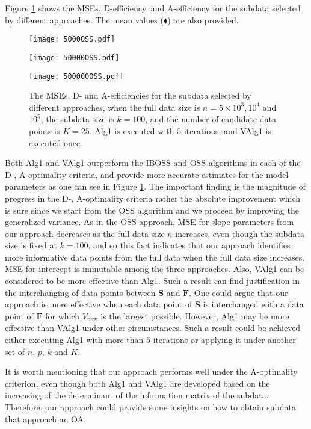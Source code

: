 \documentclass[12pt]{article}
\theoremstyle{definition}
\begin{document}
	Figure \ref{fig1} shows the MSEs, D-efficiency, and A-efficiency for the subdata selected by different approaches. The mean values ($\blacklozenge$) are also provided.
	\begin{figure}[!thb]
		{\centering
			\texttt{[image: 5000OSS.pdf]}\par}
		{\centering
			\texttt{[image: 50000OSS.pdf]}\par}
		{\centering
			\texttt{[image: 500000OSS.pdf]}\par}
		\caption{The MSEs, D- and A-efficiencies for the subdata selected by different approaches, when the full data size is $n=5\times10^3, 10^4$ and $10^5$, the subdata size is $k=100$, and the number of candidate data points is $K=25$. Alg1 is executed with $5$ iterations, and VAlg1 is executed once.}
		\label{fig1}
	\end{figure}
	
	Both Alg1 and VAlg1 outperform the IBOSS and OSS algorithms in each of the D-, A-optimality criteria, and provide more accurate estimates for the model parameters as one can see in Figure \ref{fig1}.  The important finding is the magnitude of progress in the D-, A-optimality criteria rather the absolute improvement which is sure since we start from the OSS algorithm and we proceed by improving the generalized variance.
	As in the OSS approach, MSE for slope parameters from our approach decreases as the full data size $n$ increases, even though the subdata size is fixed at $k=100$, and so this fact indicates that our approach identifies more informative data points from the full data when the full data size increases. MSE for intercept is immutable among the three approaches. Also, VAlg1 can be considered to be more effective than Alg1. Such a result can find justification in the interchanging of data points between $\textbf{S}$ and $\textbf{F}$. One could argue that our approach is more effective when each data point of $\textbf{S}$ is interchanged with a data point of $\textbf{F}$ for which $V_{\text{new}}$ is the largest possible. However, Alg1 may be more effective than VAlg1 under other circumstances. Such a result could be achieved either executing Alg1 with more than $5$ iterations or applying it under another set of $n$, $p$, $k$ and $K$.
	
	It is worth mentioning that our approach performs well under the A-optimality criterion, even though both Alg1 and VAlg1 are developed based on the increasing of the determinant of the information matrix of the subdata. Therefore, our approach could provide some insights on how to obtain subdata that approach an OA. 
	
\end{document}
